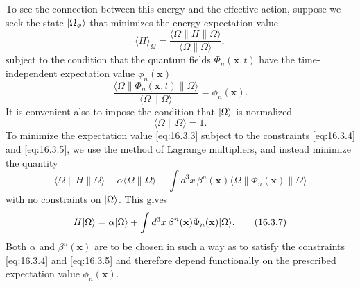 To see the connection between this energy and the effective action, suppose we seek the state $\lvert \Omega_\phi\rangle$ that minimizes the energy expectation value
\begin{equation}
\langle H\rangle_\Omega
=\frac{\langle\Omega\|H\|\Omega\rangle}{\langle\Omega\|\Omega\rangle},
\tag{16.3.3}\label{eq:16.3.3}
\end{equation}
subject to the condition that the quantum fields $\Phi_n(\mathbf{x},t)$ have the time-independent expectation value $\phi_n(\mathbf{x})$
\begin{equation}
\frac{\langle\Omega\|\Phi_n(\mathbf{x},t)\|\Omega\rangle}
{\langle\Omega\|\Omega\rangle}
=\phi_n(\mathbf{x}).
\tag{16.3.4}\label{eq:16.3.4}
\end{equation}
It is convenient also to impose the condition that $\lvert \Omega\rangle$ is normalized
\begin{equation}
\langle\Omega\|\Omega\rangle=1.
\tag{16.3.5}\label{eq:16.3.5}
\end{equation}
To minimize the expectation value \eqref{eq:16.3.3} subject to the constraints \eqref{eq:16.3.4} and \eqref{eq:16.3.5}, we use the method of Lagrange multipliers, and instead minimize the quantity
\begin{equation}
\langle\Omega\|H\|\Omega\rangle
-\alpha\langle\Omega\|\Omega\rangle
-\int d^3x\,\beta^n(\mathbf{x})
 \langle\Omega\|\Phi_n(\mathbf{x})\|\Omega\rangle
\tag{16.3.6}\label{eq:16.3.6}
\end{equation}
with no constraints on $\lvert \Omega\rangle$. This gives
\begin{equation}
H\lvert \Omega\rangle=\alpha\lvert \Omega\rangle
+\int d^3x\,\beta^n(\mathbf{x})\Phi_n(\mathbf{x})\lvert \Omega\rangle.
\tag{16.3.7}\label{eq:16.3.7}
\end{equation}
Both $\alpha$ and $\beta^n(\mathbf{x})$ are to be chosen in such a way as to satisfy the constraints \eqref{eq:16.3.4} and \eqref{eq:16.3.5} and therefore depend functionally on the prescribed expectation value $\phi_n(\mathbf{x})$.


